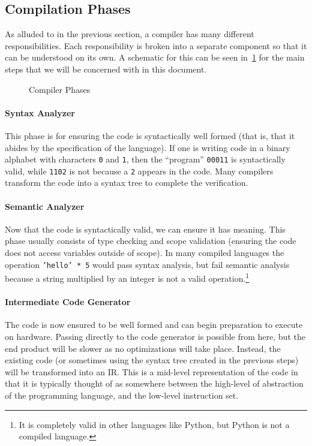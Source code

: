 \subsection{Compilation Phases}\label{sec:comp-phases}

As alluded to in the previous section, a compiler has many different responsibilities.
Each responsibility is broken into a separate component so that it can be understood on its own.
A schematic for this can be seen in~\cref{fig:compilerphases} for the main steps that we will be concerned with in this document.
\begin{figure}%
    \centering
    
    \caption{Compiler Phases}\label{fig:compilerphases} %
\end{figure}

\paragraph{Syntax Analyzer}
This phase is for ensuring the code is syntactically well formed (that is, that it abides by the specification of the language).
If one is writing code in a binary alphabet with characters \texttt{0} and \texttt{1}, then the ``program'' \texttt{00011} is syntactically valid, while \texttt{1102} is not because a \texttt{2} appears in the code.
Many compilers transform the code into a syntax tree to complete the verification.

\paragraph{Semantic Analyzer}
Now that the code is syntactically valid, we can ensure it has meaning.
This phase usually consists of type checking and scope validation (ensuring the code does not access variables outside of scope).
In many compiled languages the operation \texttt{'hello' * 5} would pass syntax analysis, but fail semantic analysis because a string multiplied by an integer is not a valid operation.\footnote{It is completely valid in other languages like Python, but Python is not a compiled language.}

\paragraph{Intermediate Code Generator}
The code is now ensured to be well formed and can begin preparation to execute on hardware.
Passing directly to the code generator is possible from here, but the end product will be slower as no optimizations will take place.
Instead, the existing code (or sometimes using the syntax tree created in the previous steps) will be transformed into an \acf{IR}.
This is a mid-level representation of the code in that it is typically thought of as somewhere between the high-level of abstraction of the programming language, and the low-level instruction set.

